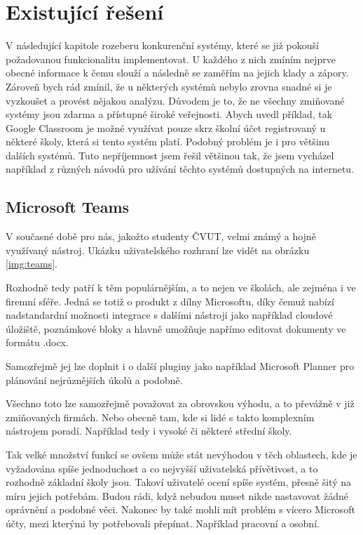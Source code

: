 

\chapter{Existující řešení}
\label{chap:existujici-reseni}

V následující kapitole rozeberu konkurenční systémy, které se již pokouší požadovanou funkcionalitu implementovat. U každého z nich zmíním nejprve obecné informace k čemu slouží a následně se zaměřím na jejich klady a zápory. Zároveň bych rád zmínil, že u některých systémů nebylo zrovna snadné si je vyzkoušet a provést nějakou analýzu. Důvodem je to, že ne všechny zmiňované systémy jsou zdarma a přístupné široké veřejnosti. Abych uvedl příklad, tak Google Classroom je možné využívat pouze skrz školní účet registrovaný u některé školy, která si tento systém platí. Podobný problém je i pro většinu dalších systémů. Tuto nepříjemnost jsem řešil většinou tak, že jsem vycházel například z různých návodů pro užívání těchto systémů dostupných na internetu.






\section{Microsoft Teams}

V současné době pro nás, jakožto studenty ČVUT, velmi známý a hojně využívaný nástroj. Ukázku uživatelského rozhraní lze vidět na obrázku \ref{img:teams}.

Rozhodně tedy patří k těm populárnějším, a to nejen ve školách, ale zejména i ve firemní sféře. Jedná se totiž o produkt z dílny Microsoftu, díky čemuž nabízí nadstandardní možnosti integrace s dalšími nástroji jako například cloudové úložiště, poznámkové bloky a hlavně umožňuje napřímo editovat dokumenty ve formátu .docx.

Samozřejmě jej lze doplnit i o další pluginy jako například Microsoft Planner pro plánování nejrůznějších úkolů a podobně.

Všechno toto lze samozřejmě považovat za obrovskou výhodu, a to převážně v již zmiňovaných firmách. Nebo obecně tam, kde si lidé s takto komplexním nástrojem poradí. Například tedy i vysoké či některé střední školy.

Tak velké množství funkcí se ovšem může stát nevýhodou v těch oblastech, kde je vyžadována spíše jednoduchost a co nejvyšší uživatelská přívětivost, a to rozhodně základní školy jsou. Takoví uživatelé ocení spíše systém, přesně šitý na míru jejich potřebám. Budou rádi, když nebudou muset nikde nastavovat žádné oprávnění a podobné věci. Nakonec by také mohli mít problém s vícero Microsoft účty, mezi kterými by potřebovali přepínat. Například pracovní a osobní.

